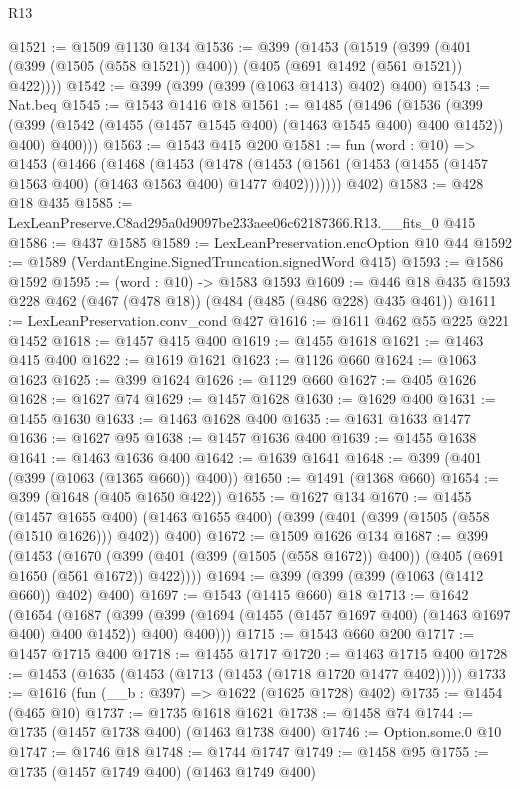 \begin{lexlean}{R13}
\begin{coremodule}
@1521 := @1509 @1130 @134
@1536 := @399
    (@1453
      (@1519 (@399 (@401 (@399 (@1505 (@558 @1521)) @400)) (@405 (@691 @1492 (@561 @1521)) @422))))
@1542 := @399 (@399 (@399 (@1063 @1413) @402) @400)
@1543 := Nat.beq
@1545 := @1543 @1416 @18
@1561 := @1485
    (@1496
      (@1536
        (@399 (@399 (@1542 (@1455 (@1457 @1545 @400) (@1463 @1545 @400) @400 @1452)) @400) @400)))
@1563 := @1543 @415 @200
@1581 := fun (word : @10) =>
  @1453
    (@1466
      (@1468
        (@1453
          (@1478 (@1453 (@1561 (@1453 (@1455 (@1457 @1563 @400) (@1463 @1563 @400) @1477 @402)))))))
      @402)
@1583 := @428 @18 @435
@1585 := LexLeanPreserve.C8ad295a0d9097be233aee06c62187366.R13.__fits_0 @415
@1586 := @437 @1585
@1589 := LexLeanPreservation.encOption @10 @44
@1592 := @1589 (VerdantEngine.SignedTruncation.signedWord @415)
@1593 := @1586 @1592
@1595 := (word : @10) -> @1583 @1593
@1609 := @446 @18 @435 @1593 @228 @462 (@467 (@478 @18)) (@484 (@485 (@486 @228) @435 @461))
@1611 := LexLeanPreservation.conv_cond @427
@1616 := @1611 @462 @55 @225 @221 @1452
@1618 := @1457 @415 @400
@1619 := @1455 @1618
@1621 := @1463 @415 @400
@1622 := @1619 @1621
@1623 := @1126 @660
@1624 := @1063 @1623
@1625 := @399 @1624
@1626 := @1129 @660
@1627 := @405 @1626
@1628 := @1627 @74
@1629 := @1457 @1628
@1630 := @1629 @400
@1631 := @1455 @1630
@1633 := @1463 @1628 @400
@1635 := @1631 @1633 @1477
@1636 := @1627 @95
@1638 := @1457 @1636 @400
@1639 := @1455 @1638
@1641 := @1463 @1636 @400
@1642 := @1639 @1641
@1648 := @399 (@401 (@399 (@1063 (@1365 @660)) @400))
@1650 := @1491 (@1368 @660)
@1654 := @399 (@1648 (@405 @1650 @422))
@1655 := @1627 @134
@1670 := @1455
    (@1457 @1655 @400)
    (@1463 @1655 @400)
    (@399 (@401 (@399 (@1505 (@558 (@1510 @1626))) @402)) @400)
@1672 := @1509 @1626 @134
@1687 := @399
    (@1453
      (@1670 (@399 (@401 (@399 (@1505 (@558 @1672)) @400)) (@405 (@691 @1650 (@561 @1672)) @422))))
@1694 := @399 (@399 (@399 (@1063 (@1412 @660)) @402) @400)
@1697 := @1543 (@1415 @660) @18
@1713 := @1642
    (@1654
      (@1687
        (@399 (@399 (@1694 (@1455 (@1457 @1697 @400) (@1463 @1697 @400) @400 @1452)) @400) @400)))
@1715 := @1543 @660 @200
@1717 := @1457 @1715 @400
@1718 := @1455 @1717
@1720 := @1463 @1715 @400
@1728 := @1453 (@1635 (@1453 (@1713 (@1453 (@1718 @1720 @1477 @402)))))
@1733 := @1616 (fun (__b : @397) => @1622 (@1625 @1728) @402)
@1735 := @1454 (@465 @10)
@1737 := @1735 @1618 @1621
@1738 := @1458 @74
@1744 := @1735 (@1457 @1738 @400) (@1463 @1738 @400)
@1746 := Option.some.{0} @10
@1747 := @1746 @18
@1748 := @1744 @1747
@1749 := @1458 @95
@1755 := @1735 (@1457 @1749 @400) (@1463 @1749 @400)

\end{coremodule}
\end{lexlean}
